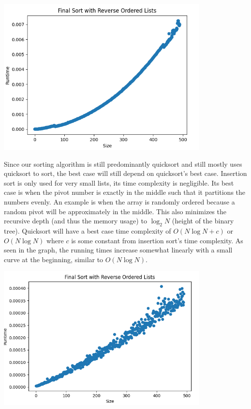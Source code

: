 \documentclass{article}
\begin{document}
\includegraphics[width=0.8\textwidth]{finalSortReverseOrderedLists}

Since our sorting algorithm is still predominantly quicksort and still mostly uses quicksort to sort, the best case will still depend on quicksort’s best case. Insertion sort is only used for very small lists, its time complexity is negligible. Its best case is when the pivot number is exactly in the middle such that it partitions the numbers evenly. An example is when the array is randomly ordered because a random pivot will be approximately in the middle. This also minimizes the recursive depth (and thus the memory usage) to $\log_2 N$ (height of the binary tree). Quicksort will have a best case time complexity of $O(N\log N + c)$ or $O(N\log N)$ where $c$ is some constant from insertion sort’s time complexity. As seen in the graph, the running times increase somewhat linearly with a small curve at the beginning, similar to $O(N\log N)$.

\includegraphics[width=0.8\textwidth]{finalSortRandomLists}
\end{document}
